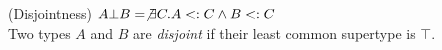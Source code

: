\documentclass[preprint]{sigplanconf}
\begin{document}
\begin{definition}{(Disjointness)}
$A \bot B = \not \exists C. A <: C \wedge B <: C$ \\

Two types $A$ and $B$ are \emph{disjoint} if their least common supertype is $\top$.
\end{definition}

%
%
\end{document}
